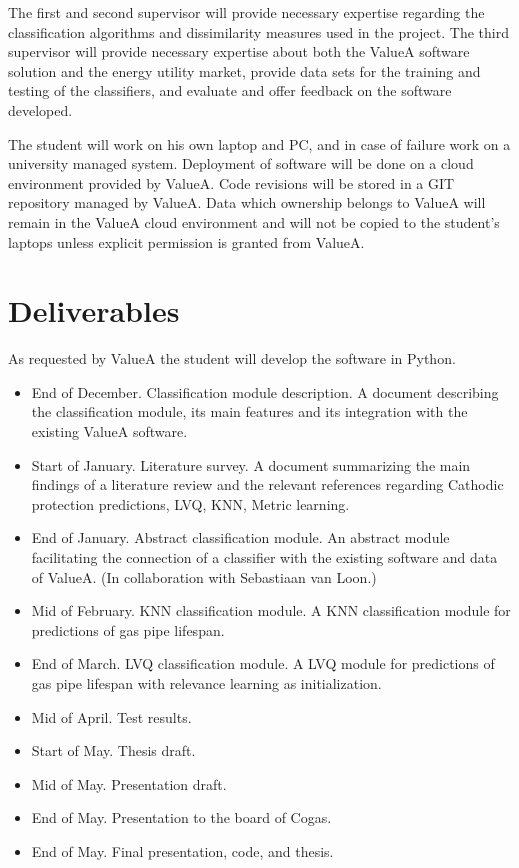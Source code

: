 The first and second supervisor will provide necessary expertise regarding the classification algorithms and dissimilarity measures used in the project. The third supervisor will provide necessary expertise about both the ValueA software solution and the energy utility market, provide data sets for the training and testing of the classifiers, and evaluate and offer feedback on the software developed.

The student will work on his own laptop and PC, and in case of failure work on a university managed system.  Deployment of software will be done on a cloud environment provided by ValueA. Code revisions will be stored in a GIT repository managed by ValueA. Data which ownership belongs to ValueA will remain in the ValueA cloud environment and will not be copied to the student’s laptops unless explicit permission is granted from ValueA.

\section{Deliverables}

As requested by ValueA the student will develop the software in Python.
\begin{itemize}
\item End of December. Classification module description. A document describing the classification module, its main features and its integration with the existing ValueA software.
\item Start of January. Literature survey. A document summarizing the main findings of a literature review and the relevant references regarding Cathodic protection predictions, LVQ, KNN, Metric learning.
\item End of January. Abstract classification module. An abstract module facilitating the connection of a classifier with the existing software and data of ValueA. (In collaboration with Sebastiaan van Loon.)
\item Mid of February. KNN classification module. A KNN classification module for predictions of gas pipe lifespan.
\item End of March. LVQ classification module. A LVQ module for predictions of gas pipe lifespan with relevance learning as initialization.
\item Mid of April. Test results.
\item Start of May. Thesis draft.
\item Mid of May. Presentation draft.
\item End of May. Presentation to the board of Cogas.
\item End of May. Final presentation, code, and thesis.
\end{itemize}